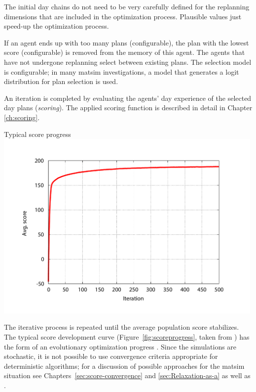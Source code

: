 The initial day chains do not need to be very carefully defined for the replanning dimensions that are included in the optimization process. Plausible values just speed-up the optimization process. 

If an agent ends up with too many plans (configurable), the plan with the lowest score (configurable) is removed from the memory of this agent. The agents that have not undergone replanning select between existing plans. The selection model is configurable; in many \gls{matsim} investigations, a model that generates a logit distribution for plan selection is used.

An iteration is completed by evaluating the agents' day experience of the selected day plans (\emph{scoring}). The applied scoring function is described in detail in Chapter \ref{ch:scoring}.

%
{Typical score progress}%
{\label{fig:scoreprogress}}%
{\includegraphics[width=0.99\textwidth, angle=0]{using/figures/scores.pdf}}%
{}

The iterative process is repeated until the average population score stabilizes.
The typical score development curve (Figure~\ref{fig:scoreprogress}, taken from \citet[][]{HorniEtAl_TRR_2009}) has the form of an evolutionary optimization progress \citep[][Figure~2.5]{EibenSmithJE_2003}.  Since the simulations are stochastic, it is not possible to use convergence criteria appropriate for deterministic algorithms; for a discussion of possible approaches for the \gls{matsim} situation see Chapters~\ref{sec:score-convergence} and \ref{sec:Relaxation-as-a} as well as \citet{Meister_PhDThesis_2011}.

